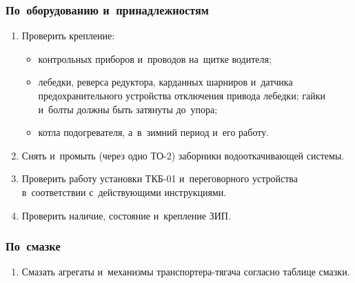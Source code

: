 \subsubsection{По~оборудованию и~принадлежностям}
\begin{enumerate}
    \item Проверить крепление:  
    \begin{itemize}
        \item контрольных приборов и~проводов на~щитке водителя; 
        \item лебедки, реверса редуктора, карданных шарниров и~датчика предохранительного устройства отключения привода лебедки; гайки и~болты должны быть затянуты до~упора; 
        \item котла подогревателя, а~в~зимний период и~его работу. 
    \end{itemize}
    \item Снять и~промыть (через одно ТО-2) заборники водооткачивающей системы. 
    \item Проверить работу установки ТКБ-01 и~переговорного устройства в~соответствии с~действующими инструкциями.  
    \item Проверить наличие, состояние и~крепление ЗИП. 
\end{enumerate}

\subsubsection{По~смазке}
\begin{enumerate}
    \item Смазать агрегаты и~механизмы транспортера-тягача согласно таблице смазки. 
\end{enumerate}


